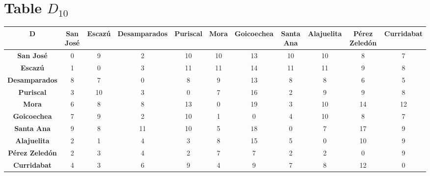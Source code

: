 \documentclass{article}
\begin{document}
\section{Table $D_{10}$}
\begin{center}
    \begin{tabular}{|c||c|c|c|c|c|c|c|c|c|c|}
        \hline
        \textbf{D} & \textbf{San José} & \textbf{Escazú} & \textbf{Desamparados} & \textbf{Puriscal} & \textbf{Mora} & \textbf{Goicoechea} & \textbf{Santa Ana} & \textbf{Alajuelita} & \textbf{Pérez Zeledón} & \textbf{Curridabat} \\
        \hline
        \hline
        \textbf{San José}& 0 & 9 & 2 & 10 & 10 & 13 & 10 & 10 & 8 & 7 \\
        \hline
        \textbf{Escazú}& 1 & 0 & 3 & 11 & 11 & 14 & 11 & 11 & 9 & 8 \\
        \hline
        \textbf{Desamparados}& 8 & 7 & 0 & 8 & \cellcolor[HTML]{D74894}$9$ & 13 & 8 & 8 & 6 & 5 \\
        \hline
        \textbf{Puriscal}& 3 & 10 & 3 & 0 & 7 & 16 & 2 & 9 & 9 & 8 \\
        \hline
        \textbf{Mora}& 6 & 8 & 8 & 13 & 0 & 19 & 3 & 10 & 14 & 12 \\
        \hline
        \textbf{Goicoechea}& 7 & 9 & 2 & 10 & 1 & 0 & 4 & 10 & 8 & 7 \\
        \hline
        \textbf{Santa Ana}& 9 & 8 & 11 & 10 & 5 & \cellcolor[HTML]{D74894}$18$ & 0 & 7 & 17 & 9 \\
        \hline
        \textbf{Alajuelita}& 2 & 1 & 4 & 3 & 8 & 15 & 5 & 0 & 10 & 9 \\
        \hline
        \textbf{Pérez Zeledón}& 2 & 3 & 4 & 2 & 7 & 7 & 2 & 2 & 0 & 9 \\
        \hline
        \textbf{Curridabat}& 4 & 3 & 6 & 9 & 4 & 9 & 7 & 8 & 12 & 0 \\
        \hline
    \end{tabular}
\end{center}
\end{document}
